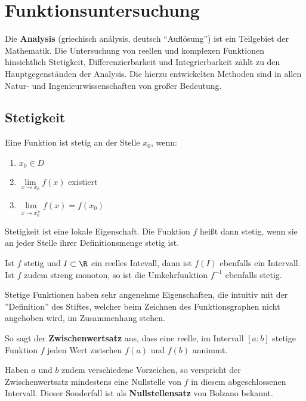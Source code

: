 \documentclass[main.tex]{subfiles}
\begin{document}
\chapter{Funktionsuntersuchung}\label{Funktionsuntersuchung}

Die \textbf{Analysis} (griechisch  análysis, deutsch "`Auflösung"') ist ein Teilgebiet der Mathematik. Die Untersuchung von reellen und komplexen Funktionen hinsichtlich Stetigkeit, Differenzierbarkeit und Integrierbarkeit zählt zu den Hauptgegenständen der Analysis. Die hierzu entwickelten Methoden sind in allen Natur- und Ingenieurwissenschaften von großer Bedeutung.

\section{Stetigkeit}

\begin{Definition}
	Eine Funktion ist stetig an der Stelle $x_{0}$, wenn:
	\begin{enumerate}
		\item $x_{0}\in D$
		\item $\lim\limits_{x \rightarrow x_{0}} {f(x)}$ existiert
		\item $\lim\limits_{x \rightarrow x_{0}^{\pm}} {f(x)}=f(x_{0})$
	\end{enumerate}
\end{Definition}

Stetigkeit ist eine lokale Eigenschaft. Die Funktion $f$ heißt dann stetig, wenn sie an jeder Stelle ihrer Definitionsmenge stetig ist.

\begin{Bemerkung}
	\begin{Theorem}
		Ist $f$ stetig und $I\subset \R$ ein reelles Intevall, dann ist $f(I)$ ebenfalls ein Intervall. Ist $f$ zudem streng monoton, so ist die Umkehrfunktion $f^{-1}$ ebenfalls stetig.
	\end{Theorem}
\end{Bemerkung}

\begin{Bemerkung}
	Stetige Funktionen haben sehr angenehme Eigenschaften, die intuitiv mit der ''Definition'' des Stiftes, welcher beim Zeichnen des Funktionsgraphen nicht angehoben wird, im Zusammenhang stehen.
	
	So sagt der \textbf{Zwischenwertsatz} aus, dass eine reelle, im Intervall $[a;b]$ stetige Funktion $f$ jeden Wert zwischen $f(a)$ und $f(b)$ annimmt.

	Haben $a$ und $b$ zudem verschiedene Vorzeichen, so verspricht der Zwischenwertsatz mindestens eine Nullstelle von $f$ in diesem abgeschlossenen Intervall. Dieser Sonderfall ist als \textbf{Nullstellensatz} von Bolzano bekannt.
\end{Bemerkung}
\end{document}
